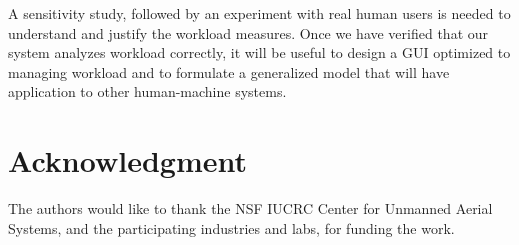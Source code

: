 A sensitivity study, followed by an experiment with real human users is needed to understand and justify the workload measures. Once we have verified that our system analyzes workload correctly, it will be useful to design a GUI optimized to managing workload and to formulate a generalized model that will have application to other human-machine systems.


\section*{Acknowledgment}
The authors would like to thank the NSF IUCRC Center for Unmanned Aerial Systems, and the participating industries and labs, for funding the work.